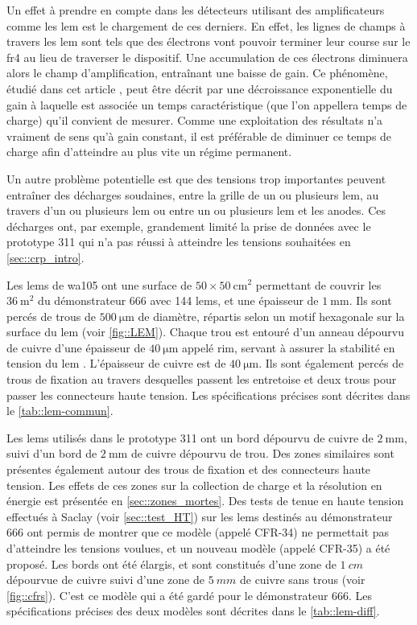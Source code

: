             Un effet à prendre en compte dans les détecteurs utilisant des amplificateurs comme les \gls{lem} est le chargement de ces derniers. En effet, les lignes de champs à travers les \gls{lem} sont tels que des électrons vont pouvoir terminer leur course sur le \gls{fr4} au lieu de traverser le dispositif. Une accumulation de ces électrons diminuera alors le champ d'amplification, entraînant une baisse de gain. Ce phénomène, étudié dans cet article \cite{3L}, peut être décrit par une décroissance exponentielle du gain à laquelle est associée un temps caractéristique (que l'on appellera temps de charge) qu'il convient de mesurer. Comme une exploitation des résultats n'a vraiment de sens qu'à gain constant, il est préférable de diminuer ce temps de charge afin d'atteindre au plus vite un régime permanent.
            
            Un autre problème potentielle est que des tensions trop importantes peuvent entraîner des décharges soudaines, entre la grille de un ou plusieurs \gls{lem}, au travers d'un ou plusieurs \gls{lem} ou entre un ou plusieurs \gls{lem} et les anodes. Ces décharges ont, par exemple, grandement limité la prise de données avec le prototype 311 qui n'a pas réussi à atteindre les tensions souhaitées en \autoref{sec::crp_intro}.
            
            Les \glspl{lem} de \gls{wa105} ont une surface de $50\times\SI{50}{\centi\meter\squared}$ permettant de couvrir les $\SI{36}{\meter\squared}$ du démonstrateur 666 avec 144 \glspl{lem}, et une épaisseur de $\SI{1}{\milli\meter}$. Ils sont percés de  trous de $\SI{500}{\micro\meter}$ de diamètre, répartis selon un motif hexagonale sur la surface du \gls{lem} (voir \autoref{fig::LEM}). Chaque trou est entouré d'un anneau dépourvu de cuivre d'une épaisseur de $\SI{40}{\micro\meter}$ appelé rim, servant à assurer la stabilité en tension du \gls{lem} \cite{thgem}. L'épaisseur de cuivre est de $\SI{40}{\micro\meter}$. Ils sont également percés de  trous de fixation au travers desquelles passent les entretoise et deux trous pour passer les connecteurs haute tension. Les spécifications précises sont décrites dans le \autoref{tab::lem-commun}.
            
            Les \glspl{lem} utilisés dans le prototype 311 ont un bord dépourvu de cuivre de $\SI{2}{\milli\meter}$, suivi d'un bord de $\SI{2}{\milli\meter}$ de cuivre dépourvu de trou. Des zones similaires sont présentes également autour des trous de fixation et des connecteurs haute tension. Les effets de ces zones sur la collection de charge et la résolution en énergie est présentée en \autoref{sec::zones_mortes}. Des tests de tenue en haute tension effectués à Saclay (voir \autoref{sec::test_HT}) sur les \glspl{lem} destinés au démonstrateur 666 ont permis de montrer que ce modèle (appelé CFR-34) ne permettait pas d'atteindre les tensions voulues, et un nouveau modèle (appelé CFR-35) a été proposé. Les bords ont été élargis, et sont constitués d'une zone de $\SI{1}{cm}$ dépourvue de cuivre suivi d'une zone de $\SI{5}{mm}$ de cuivre sans trous (voir \autoref{fig::cfrs}). C'est ce modèle qui a été gardé pour le démonstrateur 666. Les spécifications précises des deux modèles sont décrites dans le \autoref{tab::lem-diff}.
            
